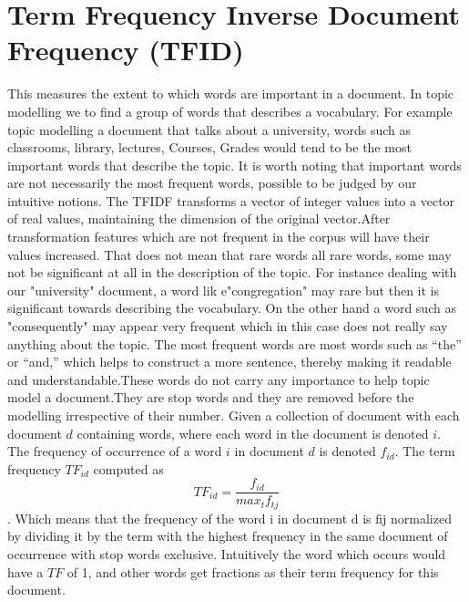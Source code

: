 \section{Term Frequency Inverse Document Frequency (TFID)}
This measures the extent to which words are important in a document.  In topic modelling we to find a group of words that describes a vocabulary. For example topic modelling a document that talks about a university, words such as classrooms, library, lectures, Courses, Grades would tend to be the most important words that describe the topic. It is worth noting that important words are not necessarily the most frequent words, possible to be judged by our intuitive notions. The TFIDF transforms a vector of integer values into a vector of real values, maintaining the dimension of the original vector.After transformation  features which are not frequent in the corpus will have their values increased. That does not mean that rare words all rare words, some may not be significant at all in the description of the topic. For instance dealing with our "university" document, a word lik e"congregation" may rare but then it is significant towards describing the vocabulary. On the other hand a word such as "consequently" may appear very frequent which in this case does not really say anything about the topic. The most frequent words are
most words such as “the” or “and,” which helps to construct a more sentence, thereby making it readable and understandable.These words do not carry any importance to help topic model a document.They are stop words and they are removed before the modelling irrespective of their number. Given a collection of document with each document $d$ containing words, where each word in the document is denoted $i$. The frequency of occurrence of a word $i$ in document $d$ is denoted $f_{id}$. The term frequency $TF_{id}$ computed as
$$TF_{id}=\frac{f_{id}}{max_tf_{tj}}$$.
Which means that the  frequency of the word  i in document d is fij normalized by dividing
it by the term with the highest frequency in the same document of occurrence with stop words exclusive. Intuitively the word which occurs would have a $TF$ of 1, and other words get fractions as their term frequency for this
document.
%
